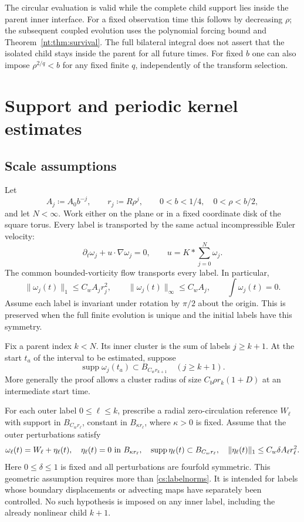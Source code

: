 \documentclass[11pt]{amsart}
\theoremstyle{remark}
\numberwithin{equation}{section}
\begin{document}
The circular evaluation is valid while the complete child support
lies inside the parent inner interface.
For a fixed observation time this follows by decreasing $\rho$;
the subsequent coupled evolution uses the polynomial forcing bound
and Theorem~\ref{nt:thm:survival}.
The full bilateral integral does not assert that the isolated child
stays inside the parent for all future times.
For fixed $b$ one can also impose $\rho^{2/q}<b$ for any fixed
finite $q$, independently of the transform selection.


\section{Support and periodic kernel estimates}\label{part:cs}
\subsection{Scale assumptions}
Let
\[
 A_j\coloneqq A_0b^{-j},\qquad r_j\coloneqq R\rho^j,
 \qquad 0<b<1/4,\quad 0<\rho<b/2,
\]
and let $N<\infty$. Work either on the plane or in a fixed coordinate disk of the square torus. Every label is transported by the same actual incompressible Euler velocity:
\[
 \partial_t\omega_j+u\cdot\nabla\omega_j=0,
 \qquad u=K*\sum_{j=0}^N\omega_j.
\]
The common bounded-vorticity flow transports every label. In particular,
\begin{equation}\label{cs:labelnorms}
 \|\omega_j(t)\|_1\le C_wA_jr_j^2,
 \qquad \|\omega_j(t)\|_\infty\le C_wA_j,
 \qquad \int\omega_j(t)=0.
\end{equation}
Assume each label is invariant under rotation by $\pi/2$ about the origin. This is preserved when the full finite evolution is unique and the initial labels have this symmetry.

Fix a parent index $k<N$. Its inner cluster is the sum of labels $j\ge k+1$. At the start $t_a$ of the interval to be estimated, suppose
\[
 \operatorname{supp}\omega_j(t_a)\subset B_{C_wr_{k+1}}
 \quad(j\ge k+1).
\]
More generally the proof allows a cluster radius of size $C_b\rho r_k(1+D)$ at an intermediate start time.

For each outer label $0\le\ell\le k$, prescribe a radial zero-circulation reference $W_\ell$ with support in $B_{C_wr_\ell}$, constant in $B_{\kappa r_\ell}$, where $\kappa>0$ is fixed. Assume that the outer perturbations satisfy
\begin{equation}\label{cs:outer}
 \omega_\ell(t)=W_\ell+\eta_\ell(t),\quad
 \eta_\ell(t)=0\ \hbox{in }B_{\kappa r_\ell},\quad
 \operatorname{supp}\eta_\ell(t)\subset B_{C_wr_\ell},\quad
 \|\eta_\ell(t)\|_1\le C_w\delta A_\ell r_\ell^2.
\end{equation}
Here $0\le\delta\le1$ is fixed and all perturbations are fourfold symmetric. This geometric assumption requires more than \eqref{cs:labelnorms}. It is intended for labels whose boundary displacements or advecting maps have separately been controlled. No such hypothesis is imposed on any inner label, including the already nonlinear child $k+1$.
\end{document}
